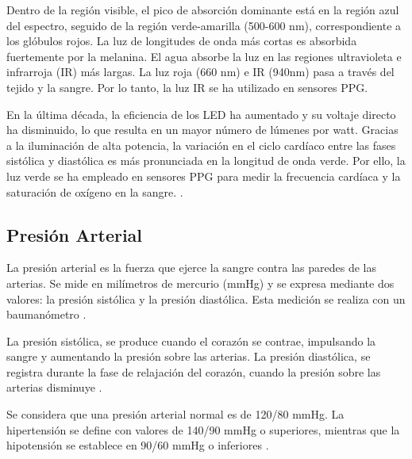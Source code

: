             Dentro de la región visible, el pico de absorción dominante está en la región azul del espectro, seguido de la región verde-amarilla (500-600 nm), correspondiente a los glóbulos rojos. La luz de longitudes de onda más cortas es absorbida fuertemente por la melanina. El agua absorbe la luz en las regiones ultravioleta e infrarroja (IR) más largas. La luz roja (660 nm) e IR (940nm) pasa a través del tejido y la sangre. Por lo tanto, la luz IR se ha utilizado en sensores PPG.
        
            En la última década, la eficiencia de los LED ha aumentado y su voltaje directo ha disminuido, lo que resulta en un mayor número de lúmenes por watt. Gracias a la iluminación de alta potencia, la variación en el ciclo cardíaco entre las fases sistólica y diastólica es más pronunciada en la longitud de onda verde. Por ello, la luz verde se ha empleado en sensores PPG para medir la frecuencia cardíaca y la saturación de oxígeno en la sangre. \cite{Tamura_2019}.

    \subsection{Presión Arterial}
    La presión arterial es la fuerza que ejerce la sangre contra las paredes de las arterias. Se mide en milímetros de mercurio (mmHg) y se expresa mediante dos valores: la presión sistólica y la presión diastólica. Esta medición se realiza con un baumanómetro \cite{PresionArterialDefinicion}.

    La presión sistólica, se produce cuando el corazón se contrae, impulsando la sangre y aumentando la presión sobre las arterias. La presión diastólica, se registra durante la fase de relajación del corazón, cuando la presión sobre las arterias disminuye \cite{fernandez_presion}.
    
    Se considera que una presión arterial normal es de 120/80 mmHg. La hipertensión se define con valores de 140/90 mmHg o superiores, mientras que la hipotensión se establece en 90/60 mmHg o inferiores \cite{DOF}.

